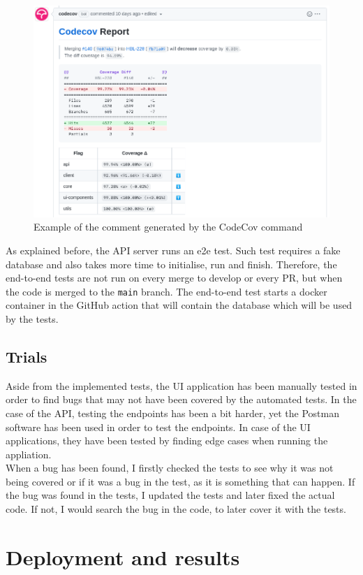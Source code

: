 \documentclass[a4paper, 12pt, oneside]{book}
\begin{document}
\begin{figure}[H]
	\centering
	\includegraphics[width=\textwidth]{assets/codecov-example.png}
	\caption{Example of the comment generated by the CodeCov command}
\end{figure}
As explained before, the API server runs an e2e test. Such test requires a fake database and also takes more time to initialise, run and finish. Therefore, the end-to-end tests are not run on every merge to develop or every PR, but when the code is merged to the \texttt{main} branch. The end-to-end test starts a docker container in the GitHub action that will contain the database which will be used by the tests.
\section{Trials}
Aside from the implemented tests, the UI application has been manually tested in order to find bugs that may not have been covered by the automated tests. In the case of the API, testing the endpoints has been a bit harder, yet the Postman software has been used in order to test the endpoints. In case of the UI applications, they have been tested by finding edge cases when running the appliation.
\\[8pt]
When a bug has been found, I firstly checked the tests to see why it was not being covered or if it was a bug in the test, as it is something that can happen. If the bug was found in the tests, I updated the tests and later fixed the actual code. If not, I would search the bug in the code, to later cover it with the tests.
\chapter{Deployment and results}
\end{document}
